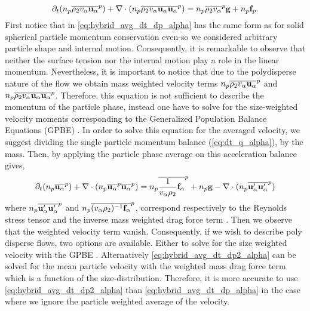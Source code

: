 \begin{equation}
    \partial_t (n_p\overline{\rho_2 v_\alpha\textbf{u}_\alpha}^{p})
    + \mathbf{\nabla} \cdot(n_p\overline{\rho_2 v_\alpha \textbf{u}_\alpha \textbf{u}_\alpha }^{p})
    = n_p\overline{\rho_2 v_\alpha}^{p}\textbf{g}
    + n_p\textbf{f}_p.
    \label{eq:hybrid_avg_dt_dp_alpha}\\
\end{equation}
First notice that in \ref{eq:hybrid_avg_dt_dp_alpha} has the same form as for solid spherical particle momentum conservation \citep{jackson1997locally} even-so we considered arbitrary particle shape and internal motion. 
Consequently, it is remarkable to observe that neither the surface tension nor the internal motion play a role in the linear momentum. 
Nevertheless, it is important to notice that due to the polydisperse nature of the flow we obtain mass weighted velocity terms $n_p\overline{\rho_2 v_\alpha\textbf{u}_\alpha}^{p}$ and $n_p\overline{\rho_2 v_\alpha\textbf{u}_\alpha\textbf{u}_\alpha}^{p}$. 
Therefore, this equation is not sufficient to describe the momentum of the particle phase, instead one have to solve for the size-weighted velocity moments corresponding to the Generalized Population Balance Equations (GPBE)  \citep{fox2023generalized}. 
In order to solve this equation for the averaged velocity, we suggest dividing the single particle momentum balance (\ref{eq:dt_q_alpha}), by the mass. 
Then, by applying the particle phase average on this acceleration balance gives, 
\begin{equation}
    \partial_t (n_p\overline{\textbf{u}_\alpha}^{p})
    + \mathbf{\nabla} \cdot(n_p\overline{\textbf{u}_\alpha}^{p}\overline{ \textbf{u}_\alpha }^{p})
    = 
    n_p\overline{\frac{1}{v_\alpha\rho_2}\textbf{f}_\alpha}^{p}
    + n_p \textbf{g}
    - \mathbf{\nabla} \cdot(n_p\overline{\textbf{u}'_\alpha \textbf{u}'_\alpha }^{p})
    \label{eq:hybrid_avg_dt_dp2_alpha}
\end{equation}
where $n_p\overline{\textbf{u}'_\alpha \textbf{u}'_\alpha }^{p}$ and $n_p\overline{(v_\alpha\rho_2)^{-1} \textbf{f}_\alpha }^{p}$, correspond respectively to the Reynolds stress tensor and the inverse mass weighted drag force term \citep{jackson1997locally}. 
Then we observe that the weighted velocity term vanish. 
Consequently, if we wish to describe poly disperse flows, two options are available. 
Either to solve for the size weighted velocity with the GPBE \citet{fox2023generalized,marchisio2013computational}.
Alternatively \ref{eq:hybrid_avg_dt_dp2_alpha} can be solved for the mean particle velocity with the weighted mass drag force term which is a function of the size-distribution.  
Therefore, it is more accurate to use \ref{eq:hybrid_avg_dt_dp2_alpha} than \ref{eq:hybrid_avg_dt_dp_alpha} in the case where we ignore the particle weighted average of the velocity. 
 



